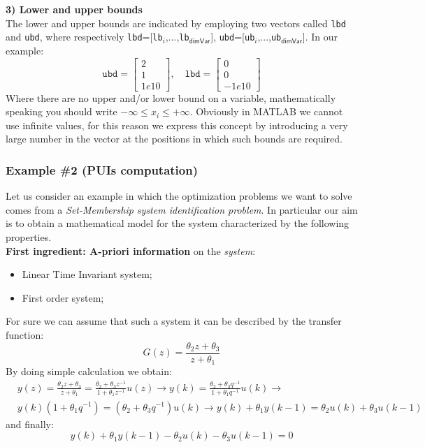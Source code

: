 \noindent
\textbf{\textsf{3) Lower and upper bounds}}\\
The lower and upper bounds are indicated by employing two vectors called \texttt{lbd} and \texttt{ubd}, where respectively \texttt{lbd}=[\texttt{lb}$_i$,...,\texttt{lb}$_\textsf{dimVar}$], \texttt{ubd}=[\texttt{ub}$_i$,...,\texttt{ub}$_\textsf{dimVar}$]. In our example:
\begin{equation*}
    \texttt{ubd} = \begin{bmatrix}
        2\\1\\1e10
    \end{bmatrix}, \quad
    \texttt{lbd} = \begin{bmatrix}
        0\\0\\-1e10
    \end{bmatrix}
\end{equation*}
Where there are no upper and/or lower bound on a variable, mathematically speaking you should write $-\infty \le x_i \le +\infty$. Obviously in MATLAB we cannot use infinite values, for this reason we express this concept by introducing a very large number in the vector at the positions in which such bounds are required.



\subsubsection{Example \#2 (PUIs computation)}
Let us consider an example in which the optimization problems we want to solve comes from a \textit{Set-Membership system identification problem}. In particular our aim is to obtain a mathematical model for the system characterized by the following properties.\\

\noindent
\textbf{First ingredient: A-priori information} on the \textit{system}:
\begin{itemize}
    \itemsep0em
    \item Linear Time Invariant system;
    \item First order system;
\end{itemize}
For sure we can assume that such a system it can be described by the transfer function:
\begin{equation*}
    G(z)  = \frac{\theta_2 z + \theta_3} {z+\theta_1}
\end{equation*}
By doing simple calculation we obtain: 
\begin{align*}
    &y(z)  = \frac{\theta_2 z + \theta_3} {z+\theta_1} = 
            \frac{\theta_2 + \theta_3 z^{-1}} {1+\theta_1 z^{-1}} u(z) \to
            y(k) = \frac{\theta_2 + \theta_3 q^{-1}} {1+\theta_1 q^{-1}} u(k) \to \\
    & y(k)(1+\theta_1 q^{-1}) = (\theta_2 + \theta_3 q^{-1})u(k) \to 
    y(k) + \theta_1 y(k-1) = \theta_2 u(k) + \theta_3 u(k-1)
\end{align*}
and finally:
\begin{equation} \label{eq:final_eq}
    y(k) + \theta_1 y(k-1)- \theta_2 u(k) - \theta_3 u(k-1)=0
\end{equation}

